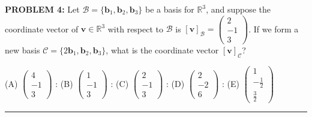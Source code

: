 \documentclass[12pt]{amsart}
\newcommand{\divider}{
  \vspace{-1em} %
  \noindent
  \raisebox{-0.15ex}{\textbullet}%
  \hspace{0.5em}%
  \rule[0.5ex]{0.95\textwidth}{1.0pt}%
  \hspace{0.5em}%
  \raisebox{-0.15ex}{\textbullet}%
  \vspace{0em} %
}
\begin{document}
\newpage


{\bf PROBLEM 4:}
Let $\mathcal{B} = \{\mathbf{b}_1, \mathbf{b}_2, \mathbf{b}_3\}$ be a basis for $\mathbb{R}^3$, 
and suppose the coordinate vector of $\mathbf{v} \in \mathbb{R}^3$ with respect to $\mathcal{B}$ is 
$[\mathbf{v}]_{\mathcal B} = \begin{pmatrix} 2 \\ -1 \\ 3 \end{pmatrix}$.
If we form a new basis ${\mathcal C} = \{2\mathbf{b}_1, \mathbf{b}_2, \mathbf{b}_3\}$, what is the coordinate vector $[\mathbf{v}]_{\mathcal C}$?

\begin{center}
(A) $\begin{pmatrix} 4 \\ -1 \\ 3 \end{pmatrix}$ \quad : \quad (B) $\begin{pmatrix} 1 \\ -1 \\ 3 \end{pmatrix}$ \quad : \quad (C) $\begin{pmatrix} 2 \\ -1 \\ 3 \end{pmatrix}$ \quad : \quad (D) $\begin{pmatrix} 2 \\ -2 \\ 6 \end{pmatrix}$ \quad : \quad (E) $\begin{pmatrix} 1 \\ -\frac{1}{2} \\ \frac{3}{2} \end{pmatrix}$%
\end{center}
\bigskip

%
\divider
\end{document}
